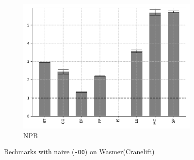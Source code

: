 \begin{figure}
\begin{subfigure}[t]{.45\textwidth}
        \includegraphics[width=\textwidth]
        {Images/6.1.RQ1/npb-wasmer-cranelift-naive.pdf}
        \caption{NPB}
    \end{subfigure}
    \caption{Bechmarks with naive (\texttt{-O0}) on Wasmer(Cranelift)}
\end{figure}

